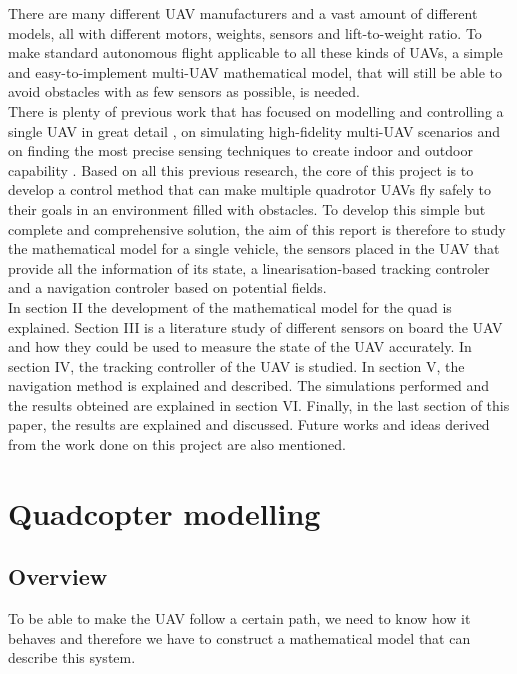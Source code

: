 \documentclass[journal]{IEEEtran}
\begin{document}
	There are many different UAV manufacturers and a vast amount of different models, all with different motors, weights, sensors and lift-to-weight ratio. To make standard autonomous flight applicable to all these kinds of UAVs, a simple and easy-to-implement multi-UAV mathematical model, that will still be able to avoid obstacles with as few sensors as possible, is needed.\\
	
	 There is plenty of previous work that has focused on modelling and controlling a single UAV in great detail \cite{intro_nolinear_model_control, mod_control_bresciani}, on simulating high-fidelity multi-UAV scenarios \cite{intro_3d_unity} and on finding the most precise sensing techniques to create indoor and outdoor capability \cite{intro_indoor_sensing}. Based on all this previous research, the core of this project is to develop a control method that can make multiple quadrotor UAVs fly safely to their goals in an environment filled with obstacles. To develop this simple but complete and comprehensive solution, the aim of this report is therefore to study the mathematical model for a single vehicle, the sensors placed in the UAV that provide all the information of its state, a linearisation-based tracking controler and a navigation controler based on potential fields. \\
	
	In section II the development of the mathematical model for the quad is explained. Section III is a literature study of different sensors on board the UAV and how they could be used to measure the state of the UAV accurately. In section IV, the tracking controller of the UAV is studied. In section V, the navigation method  is explained and described. The simulations performed and the results obteined are explained in section VI. Finally, in the last section of this paper, the results are explained and discussed. Future works and ideas derived from the work done on this project are also mentioned.

	\hfill 	
	
	
	\section{Quadcopter modelling}
	\subsection{Overview}
	To be able to make the UAV follow a certain path, we need to know how it behaves and therefore we have to construct a mathematical model that can describe this system.\\
	
\end{document}
